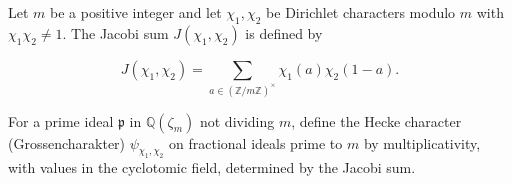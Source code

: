 Let $m$ be a positive integer and let $\chi_1, \chi_2$ be Dirichlet characters modulo $m$ with $\chi_1\chi_2 \neq 1$. The Jacobi sum $J(\chi_1, \chi_2)$ is defined by

$$J(\chi_1, \chi_2) = \sum_{a \in (\mathbb{Z}/m\mathbb{Z})^\times} \chi_1(a) \chi_2(1-a).$$

For a prime ideal $\mathfrak{p}$ in $\mathbb{Q}(\zeta_m)$ not dividing $m$, define the Hecke character (Grossencharakter) $\psi_{\chi_1,\chi_2}$ on fractional ideals prime to $m$ by multiplicativity, with values in the cyclotomic field, determined by the Jacobi sum.
